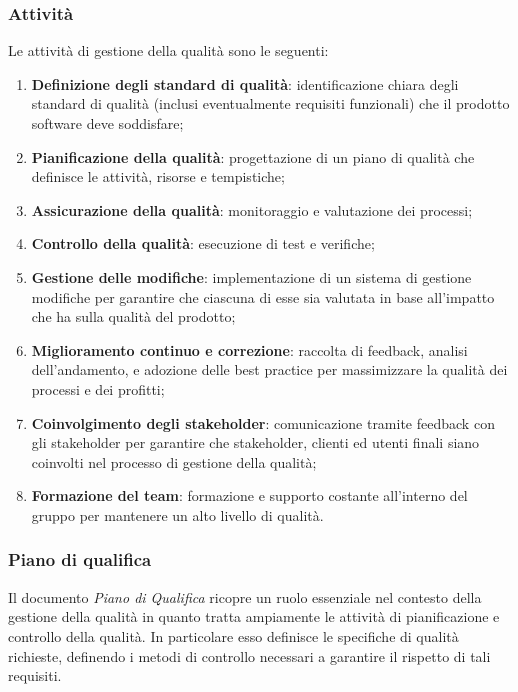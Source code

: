 \subsubsection{Attività}
Le attività di gestione della qualità sono le seguenti:
\begin{enumerate}
	\item \textbf{Definizione degli standard di qualità}: identificazione chiara degli standard di qualità
	      (inclusi eventualmente requisiti funzionali) che il prodotto software deve soddisfare;
	\item \textbf{Pianificazione della qualità}: progettazione di un piano di qualità che definisce le attività,
	      risorse e tempistiche;
	\item \textbf{Assicurazione della qualità}: monitoraggio e valutazione dei processi;
	\item \textbf{Controllo della qualità}: esecuzione di test e verifiche;
	\item \textbf{Gestione delle modifiche}: implementazione di un sistema di gestione modifiche per garantire che ciascuna di esse sia valutata
	      in base all'impatto che ha sulla qualità del prodotto;
	\item \textbf{Miglioramento continuo e correzione}: raccolta di feedback, analisi dell'andamento, e adozione delle
	      best practice per massimizzare la qualità dei processi e dei profitti;
	\item \textbf{Coinvolgimento degli stakeholder}: comunicazione tramite feedback con gli stakeholder
	      per garantire che stakeholder, clienti ed utenti finali siano coinvolti nel processo di gestione della qualità;
	\item \textbf{Formazione del team}: formazione e supporto costante all'interno del gruppo per mantenere un alto livello di qualità.
\end{enumerate}

\subsubsection{Piano di qualifica}
Il documento \textit{Piano di Qualifica} ricopre un ruolo essenziale nel contesto della gestione della qualità in quanto tratta ampiamente
le attività di pianificazione e controllo della qualità. In particolare esso definisce le specifiche di qualità
richieste, definendo i metodi di controllo necessari a garantire il rispetto di tali requisiti.

